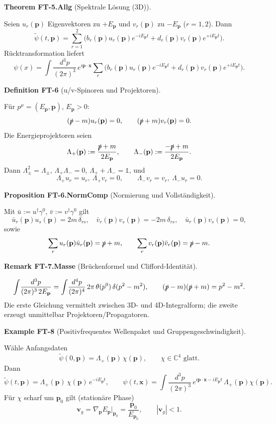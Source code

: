 \documentclass[10pt, letterpaper]{article}
\newcommand{\C}{\mathbb{C}}
\newcommand{\CustomHeading}[3]{%
  \par\medskip\noindent%
  \textbf{#1 #2} \textnormal{(#3)}.\enskip%
}
\newenvironment{DEF}[2]{\begin{unitbox}\CustomHeading{Definition}{#1}{#2}}{\end{unitbox}}
\newenvironment{PROP}[2]{\begin{unitbox}\CustomHeading{Proposition}{#1}{#2}}{\end{unitbox}}
\newenvironment{THEO}[2]{\begin{unitbox}\CustomHeading{Theorem}{#1}{#2}}{\end{unitbox}}
\newenvironment{REM}[2]{\begin{unitbox}\CustomHeading{Remark}{#1}{#2}}{\end{unitbox}}
\newenvironment{EXA}[2]{\begin{unitbox}\CustomHeading{Example}{#1}{#2}}{\end{unitbox}}
\begin{document}
\begin{THEO}{FT-5.Allg}{Spektrale Lösung (3D)}
Seien $u_r(\mathbf p)$ Eigenvektoren zu $+E_{\mathbf p}$ und $v_r(\mathbf p)$ zu $-E_{\mathbf p}$ ($r=1,2$). Dann
\[
 \tilde\psi(t,\mathbf p)=\sum_{r=1}^2\Big(b_r(\mathbf p)u_r(\mathbf p)e^{-iE_{\mathbf p}t}
 + d_r(\mathbf p)v_r(\mathbf p)e^{+iE_{\mathbf p}t}\Big).
\]
Rücktransformation liefert
\[
 \psi(x)=\int\!\frac{d^3p}{(2\pi)^3}\,e^{i\mathbf p\cdot\mathbf x}\sum_{r}
 \Big(b_r(\mathbf p)u_r(\mathbf p)e^{-iE_{\mathbf p}t}
 + d_r(\mathbf p)v_r(\mathbf p)e^{+iE_{\mathbf p}t}\Big).
\]
\end{THEO}

\begin{DEF}{FT-6}{u/v-Spinoren und Projektoren}
Für $p^\mu=(E_{\mathbf p},\mathbf p)$, $E_{\mathbf p}>0$:
\[
 (\slashed p - m)u_r(\mathbf p)=0,\qquad (\slashed p + m)v_r(\mathbf p)=0.
\]
Die Energieprojektoren seien
\[
 \Lambda_+(\mathbf p):=\frac{\slashed p+m}{2E_{\mathbf p}},
 \qquad
 \Lambda_-(\mathbf p):=\frac{-\slashed p+m}{2E_{\mathbf p}}.
\]
Dann $\Lambda_\pm^2=\Lambda_\pm$, $\Lambda_+\Lambda_-=0$, $\Lambda_++\Lambda_-=\mathbb 1$, und
\[
 \Lambda_+u_r=u_r,\ \Lambda_+v_r=0,\qquad
 \Lambda_-v_r=v_r,\ \Lambda_-u_r=0.
\]
\end{DEF}

\begin{PROP}{FT-6.NormComp}{Normierung und Vollständigkeit}
Mit $\bar u:=u^\dagger\gamma^0$, $\bar v:=v^\dagger\gamma^0$ gilt
\[
 \bar u_r(\mathbf p)u_s(\mathbf p)=2m\,\delta_{rs},\quad
 \bar v_r(\mathbf p)v_s(\mathbf p)=-2m\,\delta_{rs},\quad
 \bar u_r(\mathbf p)v_s(\mathbf p)=0,
\]
sowie
\[
 \sum_{r}u_r(\mathbf p)\bar u_r(\mathbf p)=\slashed p+m,\qquad
 \sum_{r}v_r(\mathbf p)\bar v_r(\mathbf p)=\slashed p-m.
\]
\end{PROP}

\begin{REM}{FT-7.Masse}{Brückenformel und Clifford-Identität}
\[
 \int\!\frac{d^3p}{(2\pi)^3\,2E_{\mathbf p}}
 = \int\!\frac{d^4p}{(2\pi)^4}\,2\pi\,\theta(p^0)\,\delta(p^2-m^2),\qquad
 (\slashed p-m)(\slashed p+m)=p^2-m^2.
\]
Die erste Gleichung vermittelt zwischen 3D- und 4D-Integralform; die zweite erzeugt unmittelbar Projektoren/Propagatoren.
\end{REM}

\begin{EXA}{FT-8}{Positivfrequentes Wellenpaket und Gruppengeschwindigkeit}
Wähle Anfangsdaten
\[
 \tilde\psi(0,\mathbf p)=\Lambda_+(\mathbf p)\,\chi(\mathbf p),\qquad \chi\in\C^4\text{ glatt}.
\]
Dann
\[
 \tilde\psi(t,\mathbf p)=\Lambda_+(\mathbf p)\,\chi(\mathbf p)\,e^{-iE_{\mathbf p}t},\qquad
 \psi(t,\mathbf x)=\int\!\frac{d^3p}{(2\pi)^3}\,e^{i\mathbf p\cdot\mathbf x-iE_{\mathbf p}t}\,\Lambda_+(\mathbf p)\chi(\mathbf p).
\]
Für $\chi$ scharf um $\mathbf p_0$ gilt (stationäre Phase)
\[
 \mathbf v_g=\nabla_{\mathbf p}E_{\mathbf p}\big|_{\mathbf p_0}=\frac{\mathbf p_0}{E_{\mathbf p_0}},\qquad |\mathbf v_g|<1.
\]
\end{EXA}
\end{document}
